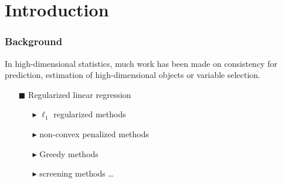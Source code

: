 \section{Introduction}
\begin{frame}
\sectionpage
\end{frame}

\begin{frame}
\frametitle{Background}
In high-dimensional statistics, much work has been made on consistency for prediction, estimation of high-dimensional objects or variable selection.
\begin{itemize}
\item[$\blacksquare$] Regularized linear regression
  \begin{itemize}
  \item[$\blacktriangleright$] $\ell_{1}$ regularized methods
  \item[$\blacktriangleright$] non-convex penalized methods
  \item[$\blacktriangleright$] Greedy methods
  \item[$\blacktriangleright$] screening methods
  \ldots
  \end{itemize}
\end{itemize}
\end{frame}

